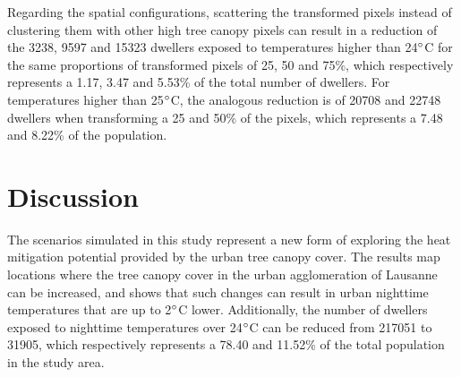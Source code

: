 \documentclass[10pt,letterpaper]{article}
\begin{document}
Regarding the spatial configurations, scattering the transformed pixels instead of clustering them with other high tree canopy pixels can result in a reduction of the 3238, 9597 and 15323 dwellers exposed to temperatures higher than 24$\degree$C for the same proportions of transformed pixels of 25, 50 and 75\%, which respectively represents a 1.17, 3.47 and 5.53\% of the total number of dwellers. For temperatures higher than 25$\degree$C, the analogous reduction is of 20708 and 22748 dwellers when transforming a 25 and 50\% of the pixels, which represents a 7.48 and 8.22\% of the population.


\section*{Discussion}

The scenarios simulated in this study represent a new form of exploring the heat mitigation potential provided by the urban tree canopy cover.
The results map locations where the tree canopy cover in the urban agglomeration of Lausanne can be increased, and shows that such changes can result in urban nighttime temperatures that are up to 2$\degree$C lower.
Additionally, the number of dwellers exposed to nighttime temperatures over 24$\degree$C can be reduced from 217051 to 31905, which respectively represents a 78.40 and 11.52\% of the total population in the study area.
\end{document}
